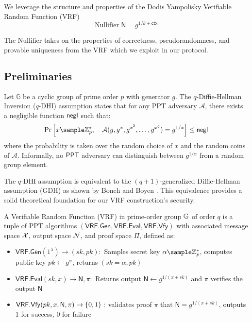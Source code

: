 We leverage the structure and properties of the Dodis Yampolisky Verifiable Random Function (VRF)
\[
\text{Nullifier } \textsf{N} = g^{1/k + \textsf{ctx}}
\]

The Nullifier takes on the properties of correctness, pseudorandomness, and provable uniqueness from the VRF which we exploit in our protocol.


\subsection{Preliminaries}

\begin{definition}
Let $\mathbb{G}$ be a cyclic group of prime order $p$ with generator $g$. The $q$-Diffie-Hellman Inversion ($q$-DHI) assumption \cite{mitsunari_new_2002} states that for any PPT adversary $\mathcal{A}$, there exists a negligible function $\mathsf{negl}$ such that:
\[
\Pr\left[ x \sample \Zp^*, \quad \mathcal{A}(g, g^x, g^{x^2}, \ldots, g^{x^q}) = g^{1/x} \right] \leq \negl 
\]
where the probability is taken over the random choice of $x$ and the random coins of $\mathcal{A}$. Informally, no $\mathsf{PPT}$ adversary can distinguish between $g^{1/\alpha}$ from a random group element.
\end{definition}

\begin{remark}
The $q$-DHI assumption is equivalent to the $(q+1)$-generalized Diffie-Hellman assumption (GDH) as shown by Boneh and Boyen \cite{kanade_efficient_2004}. This equivalence provides a solid theoretical foundation for our VRF construction's security.
\end{remark}




\begin{definition}
A Verifiable Random Function (VRF) in prime-order group $\mathbb{G}$ of order $q$ is a tuple of PPT algorithms $(\mathsf{VRF.Gen}, \mathsf{VRF.Eval}, \mathsf{VRF.Vfy})$ with associated message space $\mathcal{X}$, output space $\mathcal{N}$, and proof space $\Pi$, defined as:

\begin{itemize}
    \item $\mathsf{VRF.Gen}(1^\lambda) \to (sk, pk):$ Samples secret key $\alpha \sample \Zp^*$, computes public key $pk \gets g^\alpha$, returns $(sk = \alpha, pk)$
    
    \item $\mathsf{VRF.Eval}(sk, x) \to \textsf{N}, \pi:$ Returns output $\textsf{N} \gets g^{1/(x+sk)}$ and $\pi$ verifies the output $\textsf{N}$
    
    \item $\mathsf{VRF.Vfy}(pk, x, \textsf{N}, \pi) \to \{0,1\}:$ validates proof $\pi$ that $\textsf{N} = g^{1/(x+sk)}$, outputs 1 for success, 0 for failure
\end{itemize}
\end{definition}

